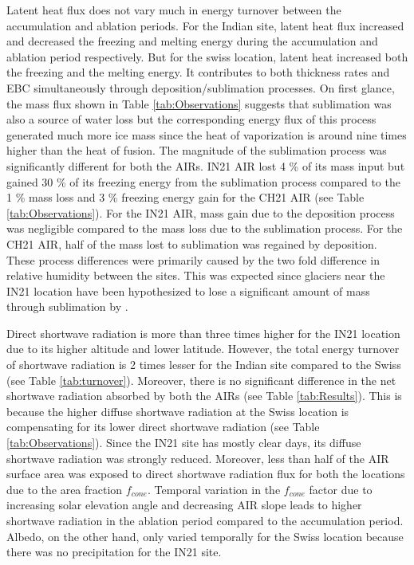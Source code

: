 \documentclass[utf8]{frontiersSCNS}
\begin{document}
Latent heat flux does not vary much in energy turnover between the accumulation and ablation periods. For the
Indian site, latent heat flux increased and decreased the freezing and melting energy during the accumulation
and ablation period respectively. But for the swiss location, latent heat increased both the freezing and the
melting energy.  It contributes to both thickness rates and EBC simultaneously through deposition/sublimation
processes. On first glance, the mass flux shown in Table \ref{tab:Observations} suggests that sublimation was
also a source of water loss but the corresponding energy flux of this process generated much more ice mass since
the heat of vaporization is around nine times higher than the heat of fusion. The magnitude of the sublimation
process was significantly different for both the AIRs.  IN21 AIR lost 4 \% of its mass input but gained 30 \% of
its freezing energy from the sublimation process compared to the 1 \% mass loss and 3 \% freezing energy gain
for the CH21 AIR (see Table \ref{tab:Observations}). For the IN21 AIR, mass gain due to the deposition process
was negligible compared to the mass loss due to the sublimation process. For the CH21 AIR, half of the mass lost
to sublimation was regained by deposition. These process differences were primarily caused by the two fold
difference in relative humidity between the sites.  This was expected since glaciers near the IN21 location have
been hypothesized to lose a significant amount of mass through sublimation by \cite{azam_2018}.

Direct shortwave radiation is more than three times higher for the IN21 location due to its higher altitude and
lower latitude. However, the total energy turnover of shortwave radiation is 2 times lesser for the Indian site
compared to the Swiss (see Table \ref{tab:turnover}). Moreover, there is no significant difference in the net
shortwave radiation absorbed by both the AIRs (see Table \ref{tab:Results}). This is because the higher diffuse
shortwave radiation at the Swiss location is compensating for its lower direct shortwave radiation (see Table
\ref{tab:Observations}). Since the IN21 site has mostly clear days, its diffuse shortwave radiation was strongly
reduced. Moreover, less than half of the AIR surface area was exposed to direct shortwave radiation flux for
both the locations due to the area fraction $f_{cone}$. Temporal variation in the $f_{cone}$ factor due to
increasing solar elevation angle and decreasing AIR slope leads to higher shortwave radiation in the ablation
period compared to the accumulation period. Albedo, on the other hand, only varied temporally for the Swiss
location because there was no precipitation for the IN21 site.
\end{document}

